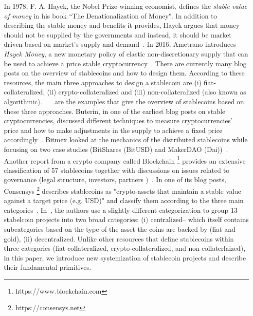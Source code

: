 In 1978, F. A. Hayek, the Nobel Prize-winning economist, defines the \textit{stable value of money} in his book ``The Denationalization of Money". In addition to describing the stable money and benefits it provides, Hayek argues that money should not be supplied by the governments and instead, it should be market driven \ie based on market's supply and demand~\cite{FHayek}. In 2016, Ametrano introduces \textit{Hayek Money}, a new monetary policy of elastic non-discretionary supply that can be used to achieve a price stable cryptocurrency~\cite{ametrano2016hayek}. There are currently many blog posts on the overview of stablecoins and how to design them. According to these resources, the main three approaches to design a stablecoin are (i) fiat-collateralized, (ii) crypto-collateralized and (iii) non-collateralized (also known as algorithmic).~\cite{hackernoon}~\cite{comprehensiveOverview}~\cite{linkedin} are the examples that give the overview of stablecoins based on these three approaches. 
Buterin, in one of the earliest blog posts on stable cryptocurrencies, discussed different techniques to measure cryptocurrencies' price and how to make adjustments in the supply to achieve a fixed price accordingly~\cite{TheSearc7:online}. Bitmex looked at the mechanics of the distributed stablecoins while focusing on two case studies (\ie BitShares (BitUSD) and MakerDAO (Dai))~\cite{bitmex}. Another report from a crypto company called Blockchain \footnote{https://www.blockchain.com} provides an extensive classification of 57 stablecoins together with discussions on issues related to governance (\eg legal structure, investors, partners \etc)~\cite{report}. In one of its blog posts, Consensys \footnote{https://consensys.net} describes stablecoins as "crypto-assets that maintain a stable value against a target price (e.g. USD)" and classify them according to the three main categories~\cite{StateofS96:online}. In~\cite{cryptoinsider}, the authors use a slightly different categorization to group 13 stabelcoin projects into two broad categories: (i) centralized-- which itself contains subcategories based on the type of the asset the coins are backed by (\eg fiat and gold), (ii) decentralized. Unlike other resources that define stablecoins within three categories (fiat-collateralized, crypto-collateralized, and non-collaterlaized), in this paper, we introduce new systemization of stablecoin projects and describe their fundamental primitives.



